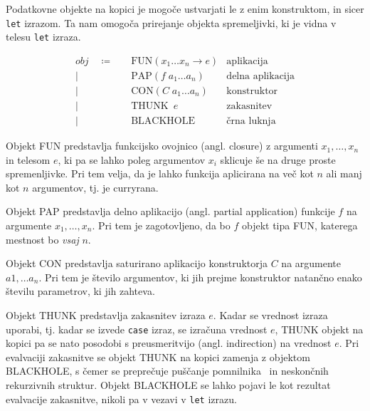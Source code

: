 Podatkovne objekte na kopici je mogoče ustvarjati le z enim konstruktom, in sicer \texttt{let} izrazom. Ta nam omogoča prirejanje objekta spremeljivki, ki je vidna v telesu \texttt{let} izraza.


\begin{align*}
	obj \quad \coloneq& \quad \text{FUN}(x_1 \dots x_n \to e) & \text{aplikacija}\\
	\vert& \quad \text{PAP}(f \; a_1 \dots a_n) & \text{delna aplikacija}\\
	\vert& \quad \text{CON}(C \; a_1 \dots a_n) & \text{konstruktor}\\
	\vert& \quad \text{THUNK} \enspace e & \text{zakasnitev}\\
	\vert& \quad \text{BLACKHOLE} & \text{črna luknja}
\end{align*}

Objekt \textsc{FUN} predstavlja funkcijsko ovojnico (angl. closure) z argumenti $x_1, \dots, x_n$ in telesom $e$, ki pa se lahko poleg argumentov $x_i$ sklicuje še na druge proste spremenljivke. Pri tem velja, da je lahko funkcija aplicirana na več kot $n$ ali manj kot $n$ argumentov, tj. je curryrana.

Objekt \textsc{PAP} predstavlja delno aplikacijo (angl. partial application) funkcije $f$ na argumente $x_1, \dots, x_n$. Pri tem je zagotovljeno, da bo $f$ objekt tipa \textsc{FUN}, katerega mestnost bo \textit{vsaj} $n$.

Objekt \textsc{CON} predstavlja saturirano aplikacijo konstruktorja $C$ na argumente $a1, \dots a_n$. Pri tem je število argumentov, ki jih prejme konstruktor natančno enako številu parametrov, ki jih zahteva.

Objekt \textsc{THUNK} predstavlja zakasnitev izraza $e$. Kadar se vrednost izraza uporabi, tj. kadar se izvede \texttt{case} izraz, se izračuna vrednost $e$, \textsc{THUNK} objekt na kopici pa se nato posodobi s preusmeritvijo (angl. indirection) na vrednost $e$. Pri evalvaciji zakasnitve se objekt \textsc{THUNK} na kopici zamenja z objektom \textsc{BLACKHOLE}, s čemer se preprečuje puščanje pomnilnika~\cite{jones1992tail} in neskončnih rekurzivnih struktur. Objekt \textsc{BLACKHOLE} se lahko pojavi le kot rezultat evalvacije zakasnitve, nikoli pa v vezavi v \texttt{let} izrazu.
